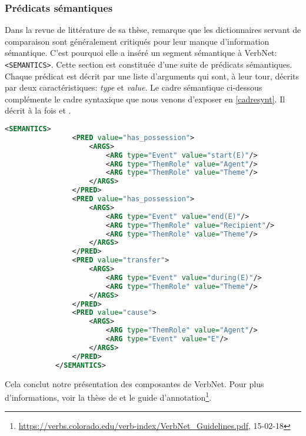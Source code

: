 \subsubsection{Prédicats sémantiques}
Dans la revue de littérature de sa thèse, \cite{SchulerVerbnetBroadcoverageComprehensive2005} remarque que les dictionnaires servant de comparaison sont généralement critiqués pour leur manque d'information sémantique. C'est pourquoi elle a inséré un segment sémantique à VerbNet: \lstinline{<SEMANTICS>}. Cette section est constituée d'une suite de prédicats sémantiques. Chaque prédicat est décrit par une liste d'arguments qui sont, à leur tour, décrits par deux caractéristiques: \emph{type} et \emph{value}. Le cadre sémantique ci-dessous complémente le cadre syntaxique que nous venons d'exposer en \ref{cadresynt}. Il décrit à la fois  et .

\begin{lstlisting}[language=Xml, caption=Les prédicats sémantiques, label=cadresem]
<SEMANTICS>
                <PRED value="has_possession">
                    <ARGS>
                        <ARG type="Event" value="start(E)"/>
                        <ARG type="ThemRole" value="Agent"/>
                        <ARG type="ThemRole" value="Theme"/>
                    </ARGS>
                </PRED>
                <PRED value="has_possession">
                    <ARGS>
                        <ARG type="Event" value="end(E)"/>
                        <ARG type="ThemRole" value="Recipient"/>
                        <ARG type="ThemRole" value="Theme"/>
                    </ARGS>
                </PRED>
                <PRED value="transfer">
                    <ARGS>
                        <ARG type="Event" value="during(E)"/>
                        <ARG type="ThemRole" value="Theme"/>
                    </ARGS>
                </PRED>
                <PRED value="cause">
                    <ARGS>
                        <ARG type="ThemRole" value="Agent"/>
                        <ARG type="Event" value="E"/>
                    </ARGS>
                </PRED>
            </SEMANTICS>
\end{lstlisting}

Cela conclut notre présentation des composantes de VerbNet. Pour plus d'informations, voir la thèse de \cite{SchulerVerbnetBroadcoverageComprehensive2005} et le guide d'annotation\footnote{\url{https://verbs.colorado.edu/verb-index/VerbNet_Guidelines.pdf}, 15-02-18}.


